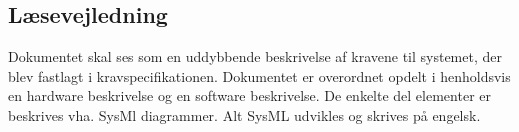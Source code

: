\subsection{Læsevejledning}
Dokumentet skal ses som en uddybbende beskrivelse af kravene til systemet, der blev fastlagt i kravspecifikationen. Dokumentet er overordnet opdelt i henholdsvis en hardware beskrivelse og en software beskrivelse. 
De enkelte del elementer er beskrives vha. SysMl diagrammer. Alt SysML udvikles og skrives på engelsk.